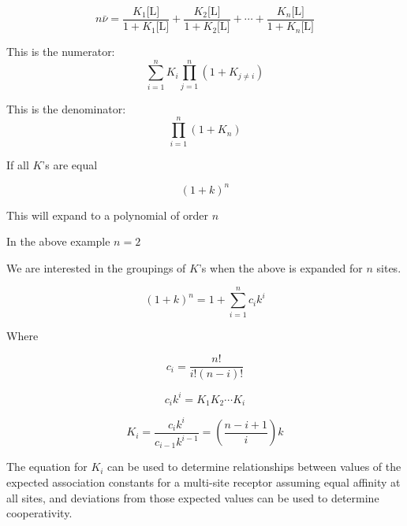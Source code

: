 \begin{equation}
n \bar{\nu} =	\frac{K_1 \text{[L]}}{1+K_1 \text{[L]}} + \frac{K_2 \text{[L]}}{1+K_2 \text{[L]}} + \cdots + \frac{K_n \text{[L]}}{1+K_n \text{[L]}}
\end{equation}

This is the numerator:
\begin{equation}
	\sum_{i=1}^{n} K_i \prod_{j=1}^{n} (1 + K_{j \neq i})
\end{equation}

This is the denominator:
\begin{equation}
	\prod_{i=1}^{n}(1 + K_n)
\end{equation}

If all \(K\)'s are equal

\begin{equation}
	(1 + k)^n
\end{equation}

This will expand to a polynomial of order \(n\) 

In the above example \(n = 2\)

We are interested in the groupings of \(K\)'s when the above is expanded for \(n\) sites.

\begin{equation}
	(1 + k)^n = 1 + \sum_{i=1}^{n} c_i k^i
\end{equation}

Where 

\begin{equation}
	c_i = \frac{n!}{i! (n-i)!}
\end{equation}

\begin{equation}
	c_i k^i = K_1 K_2 \cdots K_i 
\end{equation}

\begin{equation}
	K_i = \frac{c_i k^i}{c_{i-1} k^{i-1}} = \left(\frac{n - i + 1}{i}\right) k
\end{equation}

The equation for \(K_i\) can be used to determine relationships between values of the expected association constants for a multi-site receptor assuming equal affinity at all sites, and deviations from those expected values can be used to determine cooperativity.




	
\clearpage
